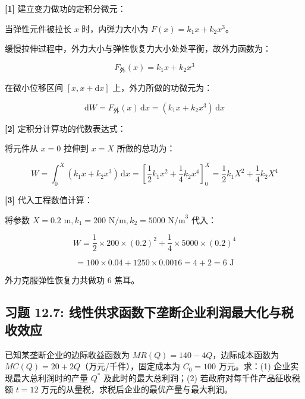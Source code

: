 \documentclass[11pt,a4paper,UTF8]{ctexart}
\begin{document}
\begin{solbox}[分步推导与答题规范]
\textbf{[1]} 建立变力做功的定积分微元：

当弹性元件被拉长 $x$ 时，内弹力大小为 $F(x) = k_1 x + k_2 x^3$。

缓慢拉伸过程中，外力大小与弹性恢复力大小处处平衡，故外力函数为：


\begin{equation*}
F_{\text{外}}(x) = k_1 x + k_2 x^3
\end{equation*}


在微小位移区间 $[x, x + \mathrm{d}x]$ 上，外力所做的功微元为：


\begin{equation*}
\mathrm{d}W = F_{\text{外}}(x)\,\mathrm{d}x = (k_1 x + k_2 x^3)\,\mathrm{d}x
\end{equation*}


\textbf{[2]} 定积分计算功的代数表达式：

将元件从 $x = 0$ 拉伸到 $x = X$ 所做的总功为：


\begin{equation*}
W = \int_0^X (k_1 x + k_2 x^3)\,\mathrm{d}x = \left[\frac{1}{2}k_1 x^2 + \frac{1}{4}k_2 x^4\right]_0^X = \frac{1}{2}k_1 X^2 + \frac{1}{4}k_2 X^4
\end{equation*}


\textbf{[3]} 代入工程数值计算：

将参数 $X = 0.2\text{ m}, k_1 = 200\text{ N/m}, k_2 = 5000\text{ N/m}^3$ 代入：


\begin{equation*}
W = \frac{1}{2} \times 200 \times (0.2)^2 + \frac{1}{4} \times 5000 \times (0.2)^4
\end{equation*}



\begin{equation*}
= 100 \times 0.04 + 1250 \times 0.0016 = 4 + 2 = 6\text{ J}
\end{equation*}


外力克服弹性恢复力共做功 $6\text{ 焦耳}$。
\end{solbox}


\subsection{习题 12.7: 线性供求函数下垄断企业利润最大化与税收效应}

已知某垄断企业的边际收益函数为 $MR(Q) = 140 - 4Q$，边际成本函数为 $MC(Q) = 20 + 2Q$（万元/千件），固定成本为 $C_0 = 100$ 万元。求：(1) 企业实现最大总利润时的产量 $Q^*$ 及此时的最大总利润；(2) 若政府对每千件产品征收税额 $t = 12$ 万元的从量税，求税后企业的最优产量与最大利润。
\end{document}
